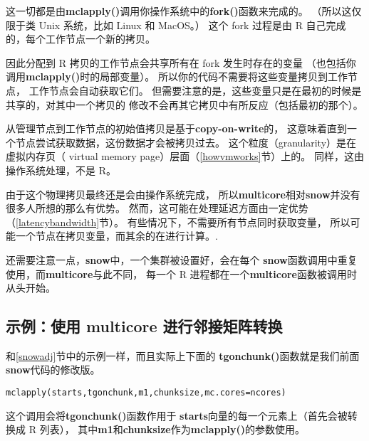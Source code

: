 这一切都是由{\bf mclapply()}调用你操作系统中的{\bf fork()}函数来完成的。
（所以这仅限于类 Unix 系统，比如 Linux 和 MacOS。）
这个 fork 过程是由 R 自己完成的，每个工作节点一个新的拷贝。

因此分配到 R 拷贝的工作节点会共享所有在 fork 发生时存在的变量
（也包括你调用{\bf mclapply()}时的局部变量）。
所以你的代码不需要将这些变量拷贝到工作节点，
工作节点会自动获取它们。
但需要注意的是，这些变量只是在最初的时候是共享的，对其中一个拷贝的
修改不会再其它拷贝中有所反应（包括最初的那个）。

从管理节点到工作节点的初始值拷贝是基于{\bf copy-on-write}的，
这意味着直到一个节点尝试获取数据，这份数据才会被拷贝过去。
这个粒度（granularity）是在虚拟内存页（ virtual memory page）层面（\ref{howvmworks}节）上的。
同样，这由操作系统处理，不是 R。

由于这个物理拷贝最终还是会由操作系统完成，
所以{\bf multicore}相对{\bf snow}并没有很多人所想的那么有优势。
然而，这可能在处理延迟方面由一定优势（\ref{latencybandwidth}节）。
有些情况下，不需要所有节点同时获取变量，
所以可能一个节点在拷贝变量，而其余的在进行计算。.

还需要注意一点，{\bf snow}中，一个集群被设置好，会在每个
{\bf snow}函数调用中重复使用，而{\bf multicore}与此不同，
每一个 R 进程都在一个{\bf multicore}函数被调用时从头开始。

\subsection{示例：使用 multicore 进行邻接矩阵转换}

和\ref{snowadj}节中的示例一样，而且实际上下面的
{\bf tgonchunk()}函数就是我们前面
{\bf snow}代码的修改版。



\begin{lstlisting}
mclapply(starts,tgonchunk,m1,chunksize,mc.cores=ncores)
\end{lstlisting}

这个调用会将{\bf tgonchunk()}函数作用于
{\bf starts}向量的每一个元素上（首先会被转换成 R 列表），
其中{\bf m1}和{\bf chunksize}作为{\bf mclapply()}的参数使用。

